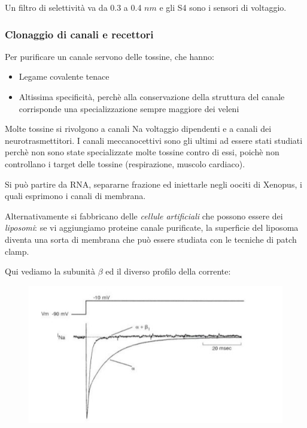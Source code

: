\documentclass[a4paper,12pt]{article}
\begin{document}
Un filtro di selettività va da 0.3 a 0.4 $nm$ e gli S4 sono i sensori di voltaggio.

\subsubsection{Clonaggio di canali e recettori}
Per purificare un canale servono delle tossine, che hanno:
\begin{itemize}
\item{Legame covalente tenace}
\item{Altissima specificità, perchè alla conservazione della struttura del canale corrisponde una specializzazione sempre maggiore dei veleni}
\end{itemize}

Molte tossine si rivolgono a canali Na voltaggio dipendenti e a canali dei neurotrasmettitori. I canali meccanocettivi sono gli ultimi ad essere stati studiati perchè non sono state specializzate molte tossine contro di essi, poichè non controllano i target delle tossine (respirazione, muscolo cardiaco).

Si può partire da RNA, separarne frazione ed iniettarle negli oociti di Xenopus, i quali esprimono i canali di membrana.

Alternativamente si fabbricano delle \emph{cellule artificiali} che possono essere dei \emph{liposomi}: se vi aggiungiamo proteine canale purificate, la superficie del liposoma diventa una sorta di membrana che può essere studiata con le tecniche di patch clamp. 

Qui vediamo la subunità $\beta$ ed il diverso profilo della corrente:
\begin{figure}[H]
\centering
\includegraphics[scale=0.4]{immagine/beta.jpg}
\caption{}
\end{figure} 
\end{document}
